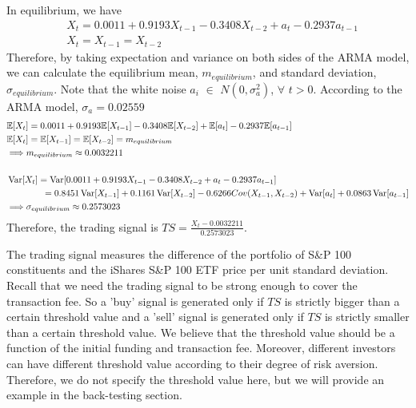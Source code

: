 \documentclass[letterpaper,12pt]{article}
\newcommand{\Var}{\operatorname{Var}}
\numberwithin{equation}{section}
\def\E{{\mathbb E}}     %
\begin{document}
	In equilibrium, we have 
	\begin{equation}
		\begin{aligned}
		&X_t = 0.0011 + 0.9193X_{t-1} - 0.3408X_{t-2}+a_t-0.2937a_{t-1} \\
		&X_t = X_{t-1} = X_{t-2}
		\end{aligned}
	\end{equation}
	Therefore, by taking expectation and variance on both sides of the ARMA model, we can calculate the equilibrium mean, $m_{equilibrium}$, and standard deviation, $\sigma_{equilibrium}$. Note that the white noise $a_i$ $\in$ $N(0,\sigma_a^2)$, $\forall$ $t > 0$. According to the ARMA model, $\sigma_a = 0.02559$
	\begin{equation}
	\begin{aligned}
	&\E[X_t] = 0.0011 + 0.9193\E[X_{t-1}] - 0.3408\E[X_{t-2}]+\E[a_t]-0.2937\E[a_{t-1}] \\
	& \E[X_t] = \E[X_{t-1}] = \E[X_{t-2}] = m_{equilibrium}\\
	&\Longrightarrow m_{equilibrium} \approx 0.0032211 \\ 
	& \\	
	&\Var[X_t] = \Var[0.0011 + 0.9193X_{t-1} - 0.3408X_{t-2}+a_t-0.2937a_{t-1}] \\
	& \hspace{0.55in}= 0.8451\Var[X_{t-1}] + 0.1161\Var[X_{t-2}] - 0.6266Cov(X_{t-1},X_{t-2}) + \Var[a_t] + 0.0863\Var[a_{t-1}] \\
	& \Longrightarrow \sigma_{equilibrium} \approx 0.2573023
	\end{aligned}	
	\end{equation}
	Therefore, the trading signal is $TS = \frac{X_t - 0.0032211}{0.2573023}$. 
	
	The trading signal measures the difference of the portfolio of S\&P 100 constituents and the iShares S\&P 100 ETF price per unit standard deviation. Recall that we need the trading signal to be strong enough to cover the transaction fee. So a 'buy' signal is generated only if $TS$ is strictly bigger than a certain threshold value and a 'sell' signal is generated only if $TS$ is strictly smaller than a certain threshold value. We believe that the threshold value should be a function of the initial funding and transaction fee. Moreover, different investors can have different threshold value according to their degree of risk aversion. Therefore, we do not specify the threshold value here, but we will provide an example in the back-testing section.
	
\end{document}
